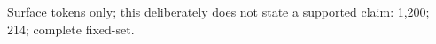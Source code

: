 Surface tokens only; this deliberately does not state a supported claim: 1,200; 214; complete fixed-set.
